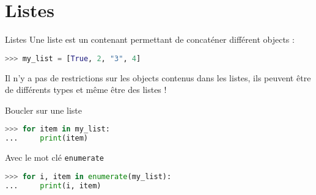     










\section{Listes}
\begin{frame}[fragile]{Listes}
Une liste est un contenant permettant de concaténer différent objects :
  \begin{lstlisting}[language=Python, morekeywords={as, TypeError}, numbers=none]
>>> my_list = [True, 2, "3", 4]
  \end{lstlisting}

Il n'y a pas de restrictions sur les objects contenus dans les listes, ils
peuvent être de différents types et même être des listes !
\end{frame}

\begin{frame}[fragile]{Boucler sur une liste}


\begin{lstlisting}[language=Python, morekeywords={True, false}, numbers=none]
>>> for item in my_list:
...     print(item)
\end{lstlisting}
    
Avec le mot clé \texttt{enumerate}
\begin{lstlisting}[language=Python, morekeywords={True, false}, numbers=none]
>>> for i, item in enumerate(my_list):
...     print(i, item)
\end{lstlisting}
\end{frame}

